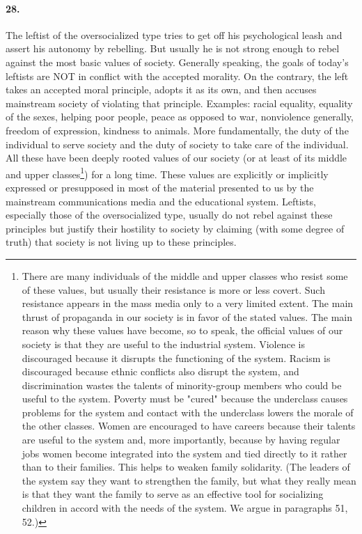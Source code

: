 \documentclass[12pt]{book}
\begin{document}
\paragraph{28.} The leftist of the oversocialized type tries to get off his psychological leash and assert his autonomy by rebelling. But usually he is not strong enough to rebel against the most basic values of society. Generally speaking, the goals of today's leftists are NOT in conflict with the accepted morality.  On the contrary, the left takes an accepted moral principle, adopts it as its own, and then accuses mainstream society of violating that principle.  Examples: racial equality, equality of the sexes, helping poor people, peace as opposed to war, nonviolence generally, freedom of expression, kindness to animals. More fundamentally, the duty of the individual to serve society and the duty of society to take care of the individual. All these have been deeply rooted values of our society (or at least of its middle and upper classes\footnote{There are many individuals of the middle and upper classes who resist some of these values, but usually their resistance is more or less covert. Such resistance appears in the mass media only to a very limited extent. The main thrust of propaganda in our society is in favor of the stated values. The main reason why these values have become, so to speak, the official values of our society is that they are useful to the industrial system. Violence is discouraged because it disrupts the functioning of the system. Racism is discouraged because ethnic conflicts also disrupt the system, and discrimination wastes the talents of minority-group members who could be useful to the system. Poverty must be "cured" because the underclass causes problems for the system and contact with the underclass lowers the morale of the other classes. Women are encouraged to have careers because their talents are useful to the system and, more importantly, because by having regular jobs women become integrated into the system and tied directly to it rather than to their families. This helps to weaken family solidarity. (The leaders of the system say they want to strengthen the family, but what they really mean is that they want the family to serve as an effective tool for socializing children in accord with the needs of the system. We argue in paragraphs 51, 52.)}) for a long time. These values are explicitly or implicitly expressed or presupposed in most of the material presented to us by the mainstream communications media and the educational system. Leftists, especially those of the oversocialized type, usually do not rebel against these principles but justify their hostility to society by claiming (with some degree of truth) that society is not living up to these principles.
\end{document}
